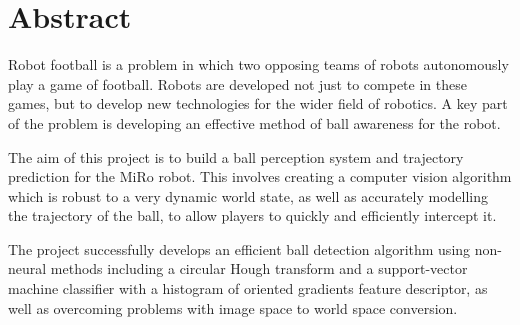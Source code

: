 \chapter*{\Large \center Abstract}

Robot football is a problem in which two opposing teams of robots autonomously play a game of football. Robots are developed not just to compete in these games, but to develop new technologies for the wider field of robotics. A key part of the problem is developing an effective method of ball awareness for the robot.

The aim of this project is to build a ball perception system and trajectory prediction for the MiRo robot. This involves creating a computer vision algorithm which is robust to a very dynamic world state, as well as accurately modelling the trajectory of the ball, to allow players to quickly and efficiently intercept it. 

The project successfully develops an efficient ball detection algorithm using non-neural methods including a circular Hough transform and a support-vector machine classifier with a histogram of oriented gradients feature descriptor, as well as overcoming problems with image space to world space conversion. 